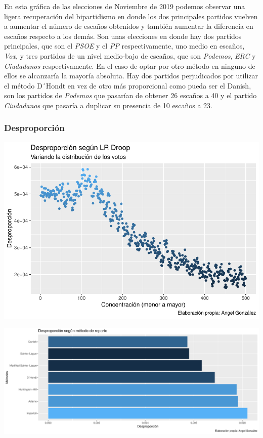 \documentclass[12pt,a4paper,]{book}
\numberwithin{dummy}{section}
\theoremstyle{ocrenumbox}
\theoremstyle{blacknumex}
\theoremstyle{blacknumbox}
\theoremstyle{ocrenum}
\theoremstyle{ocrenum}
\begin{document}
En esta gráfica de las elecciones de Noviembre de 2019 podemos observar
una ligera recuperación del bipartidismo en donde los dos principales
partidos vuelven a aumentar el número de escaños obtenidos y también
aumentar la diferencia en escaños respecto a los demás. Son unas
elecciones en donde hay dos partidos principales, que son el \emph{PSOE}
y el \emph{PP} respectivamente, uno medio en escaños, \emph{Vox}, y tres
partidos de un nivel medio-bajo de escaños, que son \emph{Podemos},
\emph{ERC} y \emph{Ciudadanos} respectivamente. En el caso de optar por
otro método en ninguno de ellos se alcanzaría la mayoría absoluta. Hay
dos partidos perjudicados por utilizar el método D´Hondt en vez de otro
más proporcional como pueda ser el Danish, son los partidos de
\emph{Podemos} que pasarían de obtener 26 escaños a 40 y el partido
\emph{Ciudadanos} que pasaría a duplicar su presencia de 10 escaños a
23.

\hypertarget{desproporciuxf3n-14}{%
\subsubsection{Desproporción}\label{desproporciuxf3n-14}}

\begin{center}\includegraphics[width=1\linewidth]{figurasR/unnamed-chunk-48-1} \end{center}

\begin{center}\includegraphics[width=1\linewidth]{figurasR/unnamed-chunk-48-2} \end{center}
\end{document}
